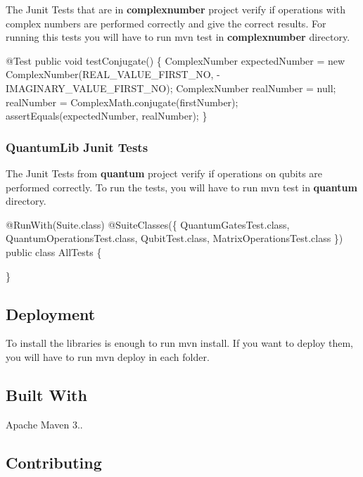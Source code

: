 The Junit Tests that are in {\bfseries complexnumber} project verify if operations with complex numbers are performed correctly and give the correct results. For running this tests you will have to run {\ttfamily mvn test} in {\bfseries complexnumber} directory.


\begin{DoxyCode}
@Test
\textcolor{keyword}{public} \textcolor{keywordtype}{void} testConjugate() \{
    ComplexNumber expectedNumber = \textcolor{keyword}{new} ComplexNumber(REAL\_VALUE\_FIRST\_NO, -IMAGINARY\_VALUE\_FIRST\_NO);
    ComplexNumber realNumber = null;
    realNumber = ComplexMath.conjugate(firstNumber);
    assertEquals(expectedNumber, realNumber);
\}
\end{DoxyCode}


\subsubsection*{Quantum\+Lib Junit Tests}

The Junit Tests from {\bfseries quantum} project verify if operations on qubits are performed correctly. To run the tests, you will have to run {\ttfamily mvn test} in {\bfseries quantum} directory.


\begin{DoxyCode}
@RunWith(Suite.class)
@SuiteClasses(\{
    QuantumGatesTest.class,
    QuantumOperationsTest.class,
    QubitTest.class,
    MatrixOperationsTest.class
\})
\textcolor{keyword}{public} \textcolor{keyword}{class} AllTests \{

\}
\end{DoxyCode}


\subsection*{Deployment}

To install the libraries is enough to run {\ttfamily mvn install}. If you want to deploy them, you will have to run {\ttfamily mvn deploy} in each folder.

\subsection*{Built With}


\begin{DoxyItemize}
\item Apache Maven 3..
\end{DoxyItemize}

\subsection*{Contributing}

